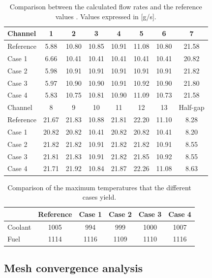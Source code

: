 \begin{table}[htbp!]
  \centering
  \caption{Comparison between the calculated flow rates and the reference values \cite{sato_computational_2010}. Values expressed in [g/s].}
  \label{tab:th-assem-flow-massflow}
  \begin{tabular}{l|ccccccc}
\toprule
Channel & 1 & 2 & 3 & 4 & 5 & 6 & 7 \\
\midrule
Reference  & 5.88 & 10.80 & 10.85 & 10.91 & 11.08 & 10.80 & 21.58 \\
Case 1  & 6.66 & 10.41 & 10.41 & 10.41 & 10.41 & 10.41 & 20.82 \\
Case 2  & 5.98 & 10.91 & 10.91 & 10.91 & 10.91 & 10.91 & 21.82 \\
Case 3  & 5.97 & 10.90 & 10.90 & 10.91 & 10.92 & 10.90 & 21.80 \\
Case 4  & 5.83 & 10.75 & 10.81 & 10.90 & 11.09 & 10.73 & 21.58 \\
\midrule
Channel & 8 & 9 & 10 & 11 & 12 & 13 & Half-gap \\
\midrule
Reference  & 21.67 & 21.83 & 10.88 & 21.81 & 22.20 & 11.10 & 8.28 \\
Case 1  & 20.82 & 20.82 & 10.41 & 20.82 & 20.82 & 10.41 & 8.20 \\
Case 2  & 21.82 & 21.82 & 10.91 & 21.82 & 21.82 & 10.91 & 8.55 \\
Case 3  & 21.81 & 21.83 & 10.91 & 21.82 & 21.85 & 10.92 & 8.55 \\
Case 4  & 21.71 & 21.92 & 10.84 & 21.87 & 22.26 & 11.08 & 8.63 \\
\bottomrule
\end{tabular}
\end{table}

\begin{table}[htbp!]
  \centering
  \caption{Comparison of the maximum temperatures that the different cases yield.}
  \label{tab:th-assem-flow-results}
\begin{tabular}{l|ccccc}
\toprule
        & Reference & Case 1 & Case 2 & Case 3 & Case 4 \\
\midrule
Coolant & 1005    &  994   &  999   & 1000  & 1007 \\
Fuel    & 1114    & 1116   & 1109   & 1110  & 1116 \\
\bottomrule
\end{tabular}
\end{table}

\subsection{Mesh convergence analysis}
\label{sec:meshconverge}

